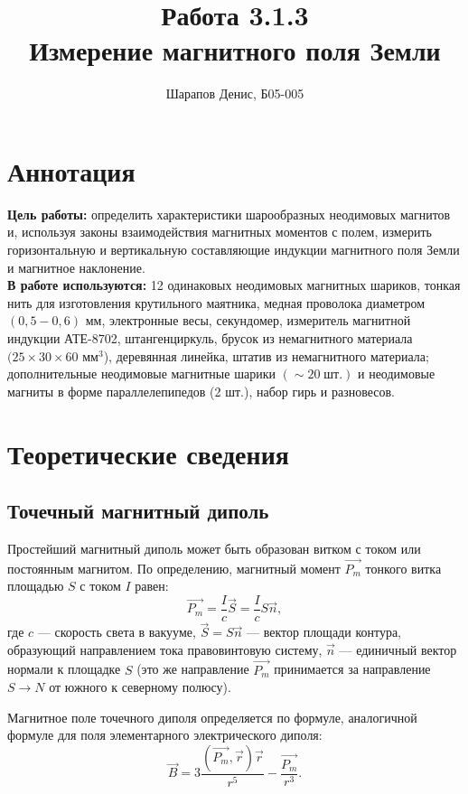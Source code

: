 \documentclass[a4paper]{article}
\title{Работа 3.1.3 \\ Измерение магнитного поля Земли}
\author{Шарапов Денис, Б05-005}
\date{}
\theoremstyle{definition}
\theoremstyle{remark}
\begin{document}
    \maketitle
    \tableofcontents
    \newpage
    
\section{Аннотация}

 \textbf{Цель работы:} определить характеристики шарообразных неодимовых магнитов и, используя законы взаимодействия магнитных моментов с полем, измерить горизонтальную и вертикальную составляющие индукции магнитного поля Земли и магнитное наклонение. \\
 
 \noindent \textbf{В работе используются:} 12 одинаковых неодимовых магнитных шариков, тонкая нить для изготовления крутильного маятника, медная проволока диаметром $(0,5 - 0,6)$ мм, электронные весы, секундомер, измеритель магнитной индукции АТЕ-8702, штангенциркуль, брусок из немагнитного материала $(25 \times 30 \times 60$ $\text{мм}^3$), деревянная линейка, штатив из немагнитного материала; дополнительные неодимовые магнитные шарики $(\sim 20 \;\text{шт}.)$ и неодимовые магниты в форме параллелепипедов (2 шт.), набор гирь и разновесов.
 
 \section{Теоретические сведения}
 
 \subsection{Точечный магнитный диполь}
 
 Простейший магнитный диполь может быть образован витком с током или постоянным магнитом. По определению, магнитный момент $\vec{P_m}$ тонкого витка площадью $S$ с током $I$ равен: $$\vec{P_m} = \frac{I}{c}\vec{S} = \frac{I}{c}S \vec{n},$$
 где $c$ --- скорость света в вакууме, $\vec{S} = S\vec{n}$ --- вектор площади контура, образующий  направлением тока правовинтовую систему, $\vec{n}$ --- единичный вектор нормали к площадке $S$ (это же направление $\vec{P_m}$ принимается за направление $S \rightarrow N$ от южного к северному полюсу).
 
 Магнитное поле точечного диполя определяется по формуле, аналогичной формуле для поля элементарного электрического диполя: $$\vec{B} = 3\frac{(\vec{P_m}, \vec{r})\vec{r}}{r^5} - \frac{\vec{P_m}}{r^3}.$$
 
\end{document}
